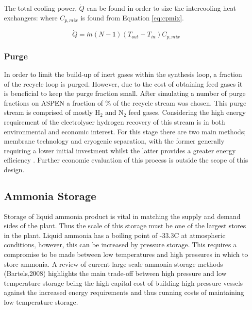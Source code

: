The total cooling power, $\dot{Q}$ can be found in order to size the intercooling heat exchangers: where $C_{p,mix}$ is found from Equation \ref{eq:cpmix}.


\begin{equation}
\label{eq:coolpowerQ}
\dot{Q} =\dot{m}(N-1)(T_{out}-T_{in})C_{p,mix}
\end{equation}

%
%		
%		
%
%


\subsubsection{Purge}
In order to limit the build-up of inert gases within the synthesis loop, a fraction of the recycle loop is purged. However, due to the cost of obtaining feed gases it is beneficial to keep the purge fraction small. After simulating a number of purge fractions on ASPEN a fraction of \purge \%  of the recycle stream was chosen. This purge stream is comprised of mostly H$_2$ and N$_2$ feed gases. Considering the high energy requirement of the electrolyser hydrogen recovery of this stream is in both environmental and economic interest. For this stage there are two main methods; membrane technology and cryogenic separation, with the former generally requiring a lower initial investment whilst the latter provides a greater energy efficiency \cite{Ojha2010}. Further economic evaluation of this process is outside the scope of this design.

\subsection{Ammonia Storage}
\label{subsec:JRstorage}

Storage of liquid ammonia product is vital in matching the supply and demand sides of the plant. Thus the scale of this storage must be one of the largest stores in the plant. Liquid ammonia has a boiling point of -33.3\textdegree C at atmospheric conditions, however, this can be increased by pressure storage. This requires a compromise to be made between low temperatures and high pressures in which to store ammonia. A review of current large-scale ammonia storage methods (Bartels,2008)\cite{Bartels2008} highlights the main trade-off between high pressure and low temperature storage being the high capital cost of building high pressure vessels against the increased energy requirements and thus running costs of maintaining low temperature storage.

